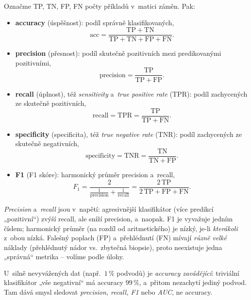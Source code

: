 \begin{definice}
Označme TP, TN, FP, FN počty příkladů v~matici záměn. Pak:
\begin{itemize}
  \item \textbf{accuracy} (úspěšnost): podíl správně klasifikovaných,
    \[ \mathrm{acc} = \frac{\mathrm{TP}+\mathrm{TN}}{\mathrm{TP}+\mathrm{TN}+\mathrm{FP}+\mathrm{FN}}. \]
  \item \textbf{precision} (přesnost): podíl skutečně pozitivních mezi predikovanými pozitivními,
    \[ \mathrm{precision} = \frac{\mathrm{TP}}{\mathrm{TP}+\mathrm{FP}}. \]
  \item \textbf{recall} (úplnost), též \emph{sensitivity} a~\emph{true positive rate} (TPR): podíl zachycených ze skutečně pozitivních,
    \[ \mathrm{recall} = \mathrm{TPR} = \frac{\mathrm{TP}}{\mathrm{TP}+\mathrm{FN}}. \]
  \item \textbf{specificity} (specificita), též \emph{true negative rate} (TNR): podíl zachycených ze skutečně negativních,
    \[ \mathrm{specificity} = \mathrm{TNR} = \frac{\mathrm{TN}}{\mathrm{TN}+\mathrm{FP}}. \]
  \item \textbf{F1} (F1 skóre): harmonický průměr precision a~recall,
    \[ F_1 = \frac{2}{\frac{1}{\mathrm{precision}}+\frac{1}{\mathrm{recall}}} = \frac{2\,\mathrm{TP}}{2\,\mathrm{TP}+\mathrm{FP}+\mathrm{FN}}. \]
\end{itemize}
\end{definice}

\begin{intuice}
\emph{Precision} a~\emph{recall} jsou v~napětí: agresivnější klasifikátor (více predikcí „pozitivní``) zvýší recall, ale sníží precision, a~naopak. F1 je vyvažuje jedním číslem; harmonický průměr (na rozdíl od aritmetického) je nízký, je-li \emph{kterákoli} z~obou nízká. Falešný poplach (FP) a~přehlédnutí (FN) mívají \emph{různě velké} náklady (přehlédnutý nádor vs.\ zbytečná biopsie), proto neexistuje jedna „správná`` metrika -- volíme podle úlohy.
\end{intuice}

\begin{poznamka}
U~silně nevyvážených dat (např.\ $1\,\%$ podvodů) je \emph{accuracy zavádějící}: triviální klasifikátor „vše negativní`` má accuracy $99\,\%$, a~přitom nezachytí jediný podvod. Tam dává smysl sledovat \emph{precision, recall, F1} nebo \emph{AUC}, ne accuracy.
\end{poznamka}

